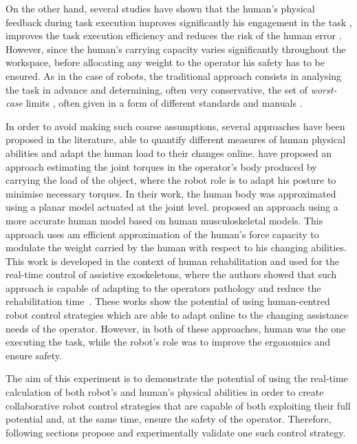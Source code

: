 On the other hand, several studies have shown that the human's physical feedback during task execution improves significantly his engagement in the task \cite{rani2007operator}, improves the task execution efficiency and reduces the risk of the human error \cite{BYRNE1996249}. However, since the human's carrying capacity varies significantly throughout the workspace, before allocating any weight to the operator his safety has to be ensured. As in the case of robots, the traditional approach consists in analysing the task in advance and determining, often very conservative, the set of \textit{worst-case} limits \cite{shoaf1997comprehensive}, often given in a form of different standards \cite{nasa} and manuals \cite{health1992manual}. 

In order to avoid making such coarse assumptions, several approaches have been proposed in the literature, able to quantify different measures of human physical abilities and adapt the human load to their changes online. \citet{Kim2018} have proposed an approach estimating the joint torques in the operator's body produced by carrying the load of the object, where the robot role is to adapt his posture to minimise necessary torques. In their work, the human body was approximated using a planar model actuated at the joint level. \citet{carmichael2013admittance} proposed an approach using a more accurate human model based on human musculoskeletal models. This approach uses am efficient approximation of the human's force capacity to modulate the weight carried by the human with respect to his changing abilities. This work is developed in the context of human rehabilitation and used for the real-time control of assistive exoskeletons, where the authors showed that such approach is capable of adapting to the operators pathology and reduce the rehabilitation time~\cite{Carmichael2013Experimental}. 
These works show the potential of using human-centred robot control strategies which are able to adapt online to the changing assistance needs of the operator. However, in both of these approaches, human was the one executing the task, while the robot's role was to improve the ergonomics and ensure safety.

The aim of this experiment is to demonstrate the potential of using the real-time calculation of both robot's and human's physical abilities in order to create collaborative robot control strategies that are capable of both exploiting their full potential and, at the same time, ensure the safety of the operator. Therefore, following sections propose and experimentally validate one such control strategy.

